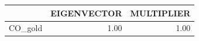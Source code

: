 \begin{tabular}{rrr}
  \hline
 & EIGENVECTOR & MULTIPLIER \\ 
  \hline
CO\_gold & 1.00 & 1.00 \\ 
   \hline
\end{tabular}
